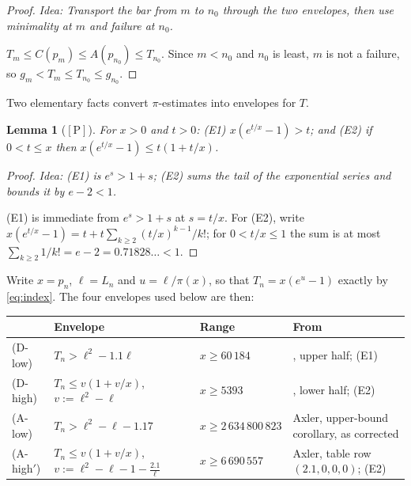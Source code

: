 \documentclass[11pt,a4paper]{article}
\theoremstyle{plain}
\newtheorem{lemma}[theorem]{Lemma}
\theoremstyle{definition}
\theoremstyle{remark}
\newcommand{\idea}[1]{\emph{Idea: #1}\par\smallskip}
\newcommand{\cP}{{[\mathrm{P}]}}
\begin{document}
\begin{proof}
\idea{Transport the bar from $m$ to $n_0$ through the two envelopes, then use minimality at $m$
and failure at $n_0$.}
$T_m \le C(p_m) \le A(p_{n_0}) \le T_{n_0}$. Since $m < n_0$ and $n_0$ is least, $m$ is not a
failure, so $g_m < T_m \le T_{n_0} \le g_{n_0}$.
\end{proof}

Two elementary facts convert $\pi$-estimates into envelopes for $T$.

\begin{lemma}[$\cP$]
\label{lem:E12}
For $x > 0$ and $t > 0$: \textup{(E1)} $x(e^{t/x}-1) > t$; and \textup{(E2)} if
$0 < t \le x$ then $x(e^{t/x}-1) \le t(1 + t/x)$.
\end{lemma}

\begin{proof}
\idea{\textup{(E1)} is $e^s > 1+s$; \textup{(E2)} sums the tail of the exponential series and
bounds it by $e - 2 < 1$.}
(E1) is immediate from $e^s > 1+s$ at $s = t/x$. For (E2), write
$x(e^{t/x}-1) = t + t\sum_{k \ge 2}(t/x)^{k-1}/k!$; for $0 < t/x \le 1$ the sum is at most
$\sum_{k\ge2} 1/k! = e - 2 = 0.71828\ldots < 1$.
\end{proof}

Write $x = p_n$, $\ell = L_n$ and $u = \ell/\pi(x)$, so that $T_n = x(e^u - 1)$ exactly by
\eqref{eq:index}. The four envelopes used below are then:

\begin{center}
\footnotesize
\begin{tabular}{@{}l l l p{}@{}}
\toprule
& Envelope & Range & From \\
\midrule
(D-low)  & $T_n > \ell^2 - 1.1\ell$ & $x \ge 60\,184$ &
  \cite[Thm.~6.9, (6.6)]{dusart2010estimates}, upper half; (E1) \\
(D-high) & $T_n \le v(1 + v/x)$, $v := \ell^2 - \ell$ & $x \ge 5393$ &
  \cite[Thm.~6.9, (6.6)]{dusart2010estimates}, lower half; (E2) \\
(A-low)  & $T_n > \ell^2 - \ell - 1.17$ & $x \ge 2\,634\,800\,823$ &
  Axler, upper-bound corollary, as corrected \\
(A-high$'$) & $T_n \le v(1 + v/x)$, $v := \ell^2 - \ell - 1 - \tfrac{2.1}{\ell}$
  & $x \ge 6\,690\,557$ & Axler, table row $(2.1,0,0,0)$; (E2) \\
\bottomrule
\end{tabular}
\end{center}
\end{document}
